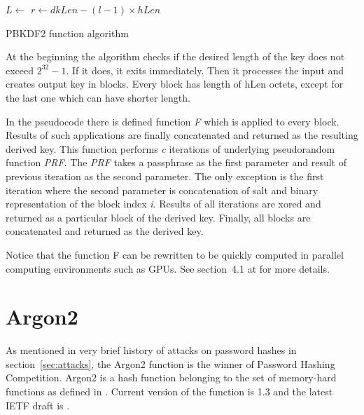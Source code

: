 \documentclass[nolof]{fithesis3}
\begin{document}
\begin{algorithm}
\DontPrintSemicolon
\LinesNumbered
{}
\(L \leftarrow \)  \;
\(r \leftarrow dkLen - (l - 1) \times hLen \)
 \;
\caption{PBKDF2 function algorithm}
\label{pbkdf2alg}
\end{algorithm}

At the beginning the algorithm checks if the desired length of the key does not exceed \(2^{32} - 1\). If it does, it exits immediately. Then it processes the input and creates output key in blocks. Every block has length of hLen octets, except for the last one which can have shorter length. 

In the pseudocode there is defined function \emph{F} which is applied to every block. Results of such applications are finally concatenated and returned as the resulting derived key. This function performs \emph{c} iterations of underlying pseudorandom function \emph{PRF}. The \emph{PRF} takes a passphrase as the first parameter and result of previous iteration as the second parameter. The only exception is the first iteration where the second parameter is concatenation of salt and binary representation of the block index \emph{i}. Results of all iterations are xored and returned as a particular block of the derived key. Finally, all blocks are concatenated and returned as the derived key.

Notice that the function F can be rewritten to be quickly computed in parallel computing environments such as GPUs. See section~4.1 at \parencite{mosnacek} for more details.

\section{Argon2}
\label{argon2}
As mentioned in very brief history of attacks on password hashes in section~\ref{sec:attacks}, the Argon2 function is the winner of Password Hashing Competition. Argon2 is a hash function belonging to the set of memory-hard functions as defined in \parencite{memoryhard}. Current version of the function is 1.3 and the latest IETF draft is \parencite{argon2draft}.
\end{document}
